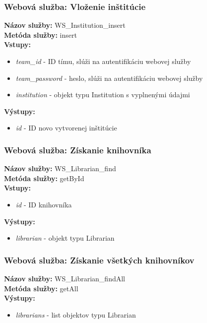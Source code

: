 \documentclass[10pt,oneside,slovak,a4paper]{article}
\begin{document}
\subsubsection{Webová služba: Vloženie inštitúcie}
\textbf{Názov služby:} WS\_Institution\_insert\\
\textbf{Metóda služby:} insert\\
\textbf{Vstupy:}
	\begin{itemize}
		\item \textit{team\_id} - ID tímu, slúži na autentifikáciu webovej služby
		\item \textit{team\_password} - heslo, slúži na autentifikáciu webovej služby
		\item \textit{institution} - objekt typu Institution s vyplnenými údajmi
	\end{itemize}
\textbf{Výstupy:}
	\begin{itemize}
		\item \textit{id} - ID novo vytvorenej inštitúcie
	\end{itemize}
	
\subsubsection{Webová služba: Získanie knihovníka}
\textbf{Názov služby:} WS\_Librarian\_find\\
\textbf{Metóda služby:} getById\\
\textbf{Vstupy:}
	\begin{itemize}
		\item \textit{id} - ID knihovníka
	\end{itemize}
\textbf{Výstupy:}
	\begin{itemize}
		\item \textit{librarian} - objekt typu Librarian
	\end{itemize}
	
\subsubsection{Webová služba: Získanie všetkých knihovníkov}
\textbf{Názov služby:} WS\_Librarian\_findAll\\
\textbf{Metóda služby:} getAll\\
\textbf{Výstupy:}
	\begin{itemize}
		\item \textit{librarians} - list objektov typu Librarian
	\end{itemize}
	
\end{document}
